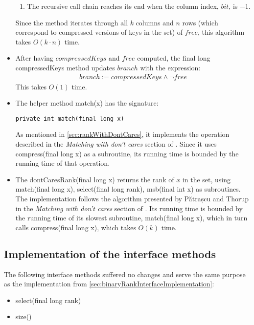\begin{itemize}
\begin{enumerate}
        \item
        The recursive call chain reaches its end when the column index, $bit$, is $-1$.
    \end{enumerate}
    Since the method iterates through all $k$ columns and $n$ rows (which correspond to compressed versions of keys in the set) of $free$, this algorithm takes $O(k \cdot n)$ time.
    
    \item
    After having $compressedKeys$ and $free$ computed, the {\ttfamily final long compressedKeys} method updates $branch$ with the expression:
    \begin{align*}
        branch := compressedKeys \wedge \neg free
    \end{align*}
    This takes $O(1)$ time.
    
    \item
    The helper method {\ttfamily match(x)} has the signature:
    \begin{lstlisting}
private int match(final long x)
    \end{lstlisting}
    As mentioned in \ref{sec:rankWithDontCares}, it implements the operation described in the \textit{Matching with don't cares} section of \cite{patrascu2014dynamic}.
    Since it uses {\ttfamily compress(final long x)} as a subroutine, its running time is bounded by the running time of that operation.
    
    \item
    The {\ttfamily dontCaresRank(final long x)} returns the rank of $x$ in the set, using {\ttfamily match(final long x)}, {\ttfamily select(final long rank)}, {\ttfamily msb(final int x)} as subroutines.
    The implementation follows the algorithm presented by Pătrașcu and Thorup in the \textit{Matching with don't cares} section of \cite{patrascu2014dynamic}.
    Its running time is bounded by the running time of its slowest subroutine, {\ttfamily match(final long x)}, which in turn calls {\ttfamily compress(final long x)}, which takes $O(k)$ time.

\end{itemize}

\subsection{Implementation of the interface methods} \label{sec:dontCaresRankInterfaceImplementation}

The following interface methods suffered no changes and serve the same purpose as the implementation from \ref{sec:binaryRankInterfaceImplementation}:
\begin{itemize}
    \item
    {\ttfamily select(final long rank)}
    
    \item
    {\ttfamily size()}
\end{itemize}

